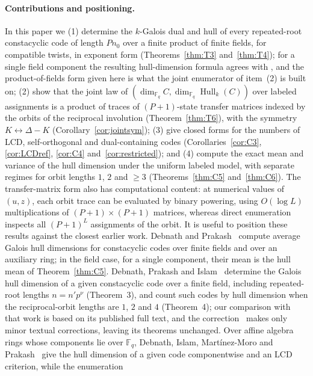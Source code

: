 \documentclass[11pt]{article}
\theoremstyle{definition}
\theoremstyle{remark}
\newcommand{\Fq}{\mathbb{F}_q}
\newcommand{\Hull}{\operatorname{Hull}}
\begin{document}
\paragraph{Contributions and positioning.}
In this paper we (1) determine the \(k\)-Galois dual and hull of every
repeated-root constacyclic code of length \(P n_0\) over a finite product
of finite fields, for compatible twists, in exponent form
(Theorems~\ref{thm:T3} and~\ref{thm:T4}); for a single field component
the resulting hull-dimension formula agrees with
\cite[Theorem~3]{DPI2023}, and the product-of-fields form given here is
what the joint enumerator of item~(2) is built on; (2) show that the joint law of
\((\dim_{\Fq} C, \dim_{\Fq} \Hull_k(C))\) over labeled assignments is a
product of traces of \((P{+}1)\)-state transfer matrices indexed by the
orbits of the reciprocal involution (Theorem~\ref{thm:T6}), with the
symmetry \(K \leftrightarrow \Delta - K\)
(Corollary~\ref{cor:jointsym}); (3) give closed forms for the numbers of
LCD, self-orthogonal and dual-containing codes
(Corollaries~\ref{cor:C3}, \ref{cor:LCDref}, \ref{cor:C4}
and~\ref{cor:restricted}); and (4) compute the exact mean and variance
of the hull dimension under the uniform labeled model, with separate
regimes for orbit lengths \(1\), \(2\) and \(\ge 3\)
(Theorems~\ref{thm:C5} and~\ref{thm:C6}). The transfer-matrix form also
has computational content: at numerical values of \((u,z)\), each orbit
trace can be evaluated by binary powering, using \(O(\log L)\)
multiplications of \((P{+}1) \times (P{+}1)\) matrices, whereas direct
enumeration inspects all \((P{+}1)^L\) assignments of the orbit.
It is useful to position these results against the closest earlier
work. Debnath and Prakash~\cite{DP2025} compute average Galois hull
dimensions for constacyclic codes over finite fields and over an
auxiliary ring; in the field case, for a single component, their mean
is the hull mean of Theorem~\ref{thm:C5}. Debnath, Prakash and
Islam~\cite{DPI2023} determine the Galois hull dimension of a given
constacyclic code over a finite field, including repeated-root lengths
\(n = n' p^{\nu}\) (Theorem~3), and count such codes by hull dimension
when the reciprocal-orbit lengths are \(1\), \(2\) and \(4\)
(Theorem~4); our comparison with that work is based on its published
full text, and the correction~\cite{DPI2023corr} makes only minor
textual corrections, leaving its theorems unchanged. Over affine
algebra rings whose components lie over \(\Fq\), Debnath, Islam,
Mart\'inez-Moro and Prakash~\cite{DIMP2026} give the hull dimension of
a given code componentwise and an LCD criterion, while the enumeration
\end{document}
